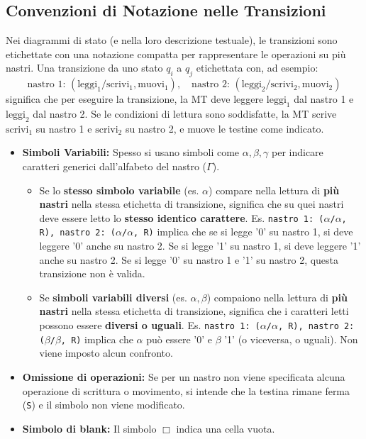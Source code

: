 \documentclass[a4paper, 11pt]{book} %
\theoremstyle{definition}
\begin{document}
\subsection{Convenzioni di Notazione nelle Transizioni}
Nei diagrammi di stato (e nella loro descrizione testuale), le transizioni sono etichettate con una notazione compatta per rappresentare le operazioni su più nastri. Una transizione da uno stato $q_i$ a $q_j$ etichettata con, ad esempio:
\[ \text{nastro 1: } (\text{leggi}_1/\text{scrivi}_1, \text{muovi}_1), \quad \text{nastro 2: } (\text{leggi}_2/\text{scrivi}_2, \text{muovi}_2) \]
significa che per eseguire la transizione, la MT deve leggere $\text{leggi}_1$ dal nastro 1 e $\text{leggi}_2$ dal nastro 2. Se le condizioni di lettura sono soddisfatte, la MT scrive $\text{scrivi}_1$ su nastro 1 e $\text{scrivi}_2$ su nastro 2, e muove le testine come indicato.

\begin{itemize}
    \item \textbf{Simboli Variabili:} Spesso si usano simboli come $\alpha, \beta, \gamma$ per indicare caratteri generici dall'alfabeto del nastro ($\Gamma$).
    \begin{itemize}
        \item Se lo \textbf{stesso simbolo variabile} (es. $\alpha$) compare nella lettura di \textbf{più nastri} nella stessa etichetta di transizione, significa che su quei nastri deve essere letto lo \textbf{stesso identico carattere}. Es. \texttt{nastro 1: ($\alpha$/$\alpha$, R), nastro 2: ($\alpha$/$\alpha$, R)} implica che se si legge '0' su nastro 1, si deve leggere '0' anche su nastro 2. Se si legge '1' su nastro 1, si deve leggere '1' anche su nastro 2. Se si legge '0' su nastro 1 e '1' su nastro 2, questa transizione non è valida.
        \item Se \textbf{simboli variabili diversi} (es. $\alpha, \beta$) compaiono nella lettura di \textbf{più nastri} nella stessa etichetta di transizione, significa che i caratteri letti possono essere \textbf{diversi o uguali}. Es. \texttt{nastro 1: ($\alpha$/$\alpha$, R), nastro 2: ($\beta$/$\beta$, R)} implica che $\alpha$ può essere '0' e $\beta$ '1' (o viceversa, o uguali). Non viene imposto alcun confronto.
    \end{itemize}
    \item \textbf{Omissione di operazioni:} Se per un nastro non viene specificata alcuna operazione di scrittura o movimento, si intende che la testina rimane ferma (\texttt{S}) e il simbolo non viene modificato.
    \item \textbf{Simbolo di blank:} Il simbolo $\Box$ indica una cella vuota.
\end{itemize}
\end{document}
